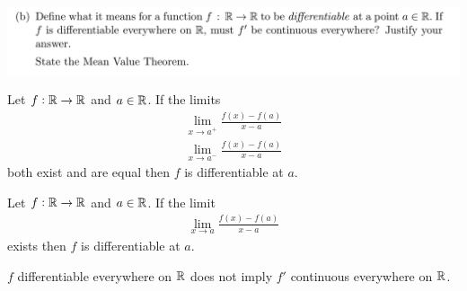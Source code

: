 \documentclass[12pt]{article}
\begin{document}
\begin{mdframed}
\includegraphics[width=400pt]{img/misc--cambridge-1a-2017-1-9D-2.png}
\end{mdframed}

\begin{definition*}
  Let $f: \mathbb{R} \to \mathbb{R}$ and $a \in \mathbb{R}$. If the limits
  \begin{align*}
    \lim_{x \to a^+} \frac{f(x) - f(a)}{x - a}\\
    \lim_{x \to a^-} \frac{f(x) - f(a)}{x - a}
  \end{align*}
  both exist and are equal then $f$ is differentiable at $a$.
\end{definition*}


\begin{definition*}
  Let $f: \mathbb{R} \to \mathbb{R}$ and $a \in \mathbb{R}$. If the limit
  \begin{align*}
    \lim_{x \to a} \frac{f(x) - f(a)}{x - a}
  \end{align*}
  exists then $f$ is differentiable at $a$.
\end{definition*}




\begin{theorem*}
  $f$ differentiable everywhere on $\mathbb{R}$ does not imply $f'$ continuous everywhere on $\mathbb{R}$.
\end{theorem*}
\end{document}

